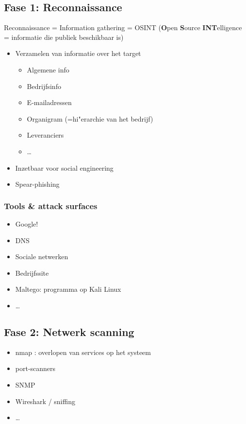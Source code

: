 \documentclass{article}
\newcommand{\bold}[1]{\textbf{#1}}
\begin{document}
\subsection{Fase 1: Reconnaissance}

Reconnaissance = Information gathering = OSINT (\bold{O}pen \bold{S}ource \bold{INT}elligence = informatie die publiek beschikbaar is)

\begin{itemize}
    \item Verzamelen van informatie over het target
    \begin{itemize}
        \item Algemene info
        \item Bedrijfsinfo
        \item E-mailadressen
        \item Organigram (=hi"erarchie van het bedrijf)
        \item Leveranciers
        \item \dots
    \end{itemize}
    \item Inzetbaar voor social engineering
    \item Spear-phishing
\end{itemize}

\subsubsection{Tools \& attack surfaces}

\begin{itemize}
    \item Google!
    \item DNS
    \item Sociale netwerken
    \item Bedrijfssite
    \item Maltego: programma op Kali Linux
    \item \dots
\end{itemize}

\subsection{Fase 2: Netwerk scanning}

\begin{itemize}
    \item nmap : overlopen van services op het systeem
    \item port-scanners
    \item SNMP
    \item Wireshark / sniffing
    \item \dots
\end{itemize}
\end{document}
